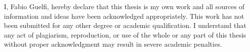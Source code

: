 \begin{originality}

I, Fabio Guelfi, hereby declare that this thesis is my own work and all sources of information and ideas have been acknowledged appropriately. This work has not been submitted for any other degree or academic qualification. I understand that any act of plagiarism, reproduction, or use of the whole or any part of this thesis without proper acknowledgment may result in severe academic penalties.
\end{originality}